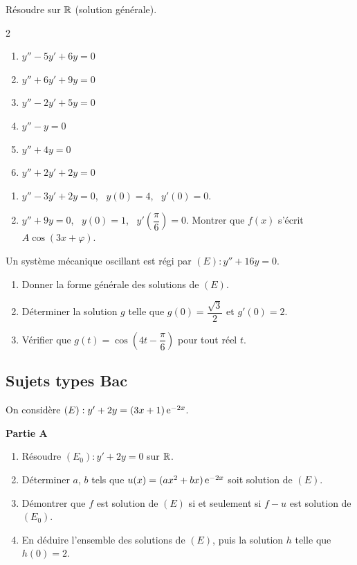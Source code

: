 Résoudre sur $\mathbb{R}$ (solution générale).
\begin{multicols}{2}
\begin{enumerate}
	\item $y''-5y'+6y=0$
	\item $y''+6y'+9y=0$
	\item $y''-2y'+5y=0$
	\item $y''-y=0$
	\item $y''+4y=0$
	\item $y''+2y'+2y=0$
\end{enumerate}
\end{multicols}

\begin{enumerate}
	\item $y''-3y'+2y=0$, \ $y(0)=4$, \ $y'(0)=0$.
	\item $y''+9y=0$, \ $y(0)=1$, \ $y'\!\left(\dfrac{\pi}{6}\right)=0$.
	Montrer que $f(x)$ s'écrit $A\cos(3x+\varphi)$.
\end{enumerate}

Un système mécanique oscillant est régi par $(E):y''+16y=0$.
\begin{enumerate}
	\item Donner la forme générale des solutions de $(E)$.
	\item Déterminer la solution $g$ telle que
	$g(0)=\dfrac{\sqrt3}{2}$ et $g'(0)=2$.
	\item Vérifier que $g(t)=\cos\!\left(4t-\dfrac{\pi}{6}\right)$ pour tout
	réel $t$.
\end{enumerate}

\subsection{Sujets types Bac}

On considère $(E):y'+2y=(3x+1)\,\mathrm{e}^{-2x}$.

\textbf{Partie A}
\begin{enumerate}
	\item Résoudre $(E_0):y'+2y=0$ sur $\mathbb{R}$.
	\item Déterminer $a$, $b$ tels que $u(x)=(a x^{2}+bx)\,\mathrm{e}^{-2x}$ soit
	solution de $(E)$.
	\item Démontrer que $f$ est solution de $(E)$ si et seulement si $f-u$ est
	solution de $(E_0)$.
	\item En déduire l'ensemble des solutions de $(E)$, puis la solution $h$
	telle que $h(0)=2$.
\end{enumerate}

